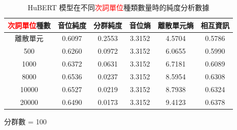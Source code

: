 {\begin{table}[!htbp]
            \begin{subtable}[t]{\textwidth}
                \centering
                \begin{tabular}{|c|c|c|c|c|c|} \hline
                    \textcolor{red}{次詞單位}種數 & 音位純度   & 分群純度   & 音位熵    & 離散單元熵  & 相互資訊   \\ \hline
                                         離散單元 &     0.6097 &     0.2553 &    3.3152 &      4.5704 &     0.5786 \\ \hline
                                             500  &     0.6260 &     0.0972 &    3.3152 &      6.0655 &     0.5990 \\ \hline %
                                            1000  &     0.6372 &     0.0631 &    3.3152 &      6.7181 &     0.6089 \\ \hline %
                                            8000  &     0.6536 &     0.0237 &    3.3152 &      8.5954 &     0.6308 \\ \hline %
                                           10000  &     0.6527 &     0.0219 &    3.3152 &      8.7938 &     0.6324 \\ \hline %
                                           20000  &     0.6490 &     0.0173 &    3.3152 &      9.4123 &     0.6378 \\ \hline %
                \end{tabular}
                \caption{分群數 = 100}
                \label{tab:ch4-hubert-phn-clu100-}
            \end{subtable}

            \caption{HuBERT 模型在不同\textcolor{red}{次詞單位}種類數量時的純度分析數據}
            \label{tab:hubert-phn-results-}
        \end{table}

    }  %
